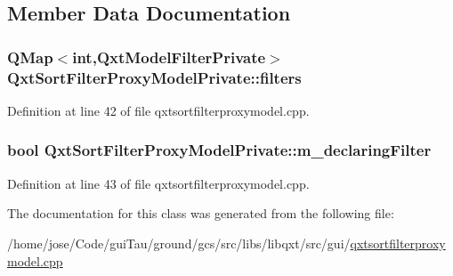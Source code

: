 \subsection{Member Data Documentation}
\hypertarget{class_qxt_sort_filter_proxy_model_private_ab0c67676026ff5fbd46522d09a73cda9}{
\subsubsection[{filters}]{\setlength{\rightskip}{0pt plus 5cm}Q\-Map$<${\bf int},{\bf Qxt\-Model\-Filter\-Private}$>$ Qxt\-Sort\-Filter\-Proxy\-Model\-Private\-::filters}}\label{class_qxt_sort_filter_proxy_model_private_ab0c67676026ff5fbd46522d09a73cda9}


Definition at line 42 of file qxtsortfilterproxymodel.\-cpp.

\hypertarget{class_qxt_sort_filter_proxy_model_private_a674517e465342248fdc74ecc6eb8402e}{
\subsubsection[{m\-\_\-declaring\-Filter}]{\setlength{\rightskip}{0pt plus 5cm}bool Qxt\-Sort\-Filter\-Proxy\-Model\-Private\-::m\-\_\-declaring\-Filter}}\label{class_qxt_sort_filter_proxy_model_private_a674517e465342248fdc74ecc6eb8402e}


Definition at line 43 of file qxtsortfilterproxymodel.\-cpp.



The documentation for this class was generated from the following file\-:\begin{DoxyCompactItemize}
\item 
/home/jose/\-Code/gui\-Tau/ground/gcs/src/libs/libqxt/src/gui/\hyperlink{qxtsortfilterproxymodel_8cpp}{qxtsortfilterproxymodel.\-cpp}\end{DoxyCompactItemize}
